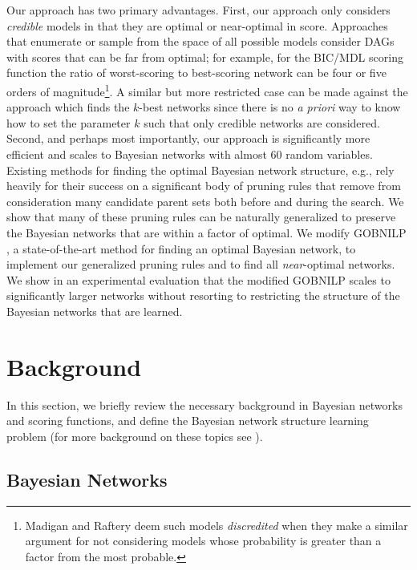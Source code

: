 \documentclass[letterpaper]{article}
\begin{document}
Our approach has two primary advantages. First, our approach
only considers \emph{credible } models in that they are
optimal or near-optimal in score. Approaches that enumerate
or sample from the space of all possible models consider DAGs
with scores that can be far from optimal; for example,
for the BIC/MDL scoring function the ratio of worst-scoring
to best-scoring network can be four or five orders of
magnitude\footnote{Madigan and Raftery 
deem such models \emph{discredited} when they make a similar
argument for not considering models whose probability is
greater than a factor from the most probable.}. A
similar but more restricted case can be made against the
approach which finds the $k$-best networks since there is no 
\emph{a priori} way to know how to set the parameter $k$ such that only
credible  networks are considered. Second, and perhaps most
importantly, our approach is significantly more efficient and
scales to Bayesian networks with almost 60 random variables. Existing
methods for finding the optimal Bayesian network structure, e.g., \cite{BartlettC13,vanBeek2015}
rely heavily for their success on a significant body of
pruning rules that remove from consideration many candidate
parent sets both before and during the search. We show that many 
of these pruning rules can be
naturally generalized to preserve the Bayesian networks that are 
within a factor of optimal. 
We modify GOBNILP \cite{BartlettC13}, a state-of-the-art method for finding
an optimal Bayesian network, to implement our generalized pruning rules
and to find all \emph{near}-optimal networks. We show in an experimental
evaluation that the modified GOBNILP scales to significantly
larger networks without resorting to restricting the structure of the Bayesian networks that are learned.

\section{Background}\label{sec:background}

In this section, we briefly review the necessary background in
Bayesian networks and scoring functions, and define the Bayesian network structure
learning problem (for more background on these topics see \cite{Darwiche09,KollerF09}).

\subsection{Bayesian Networks}
\end{document}
